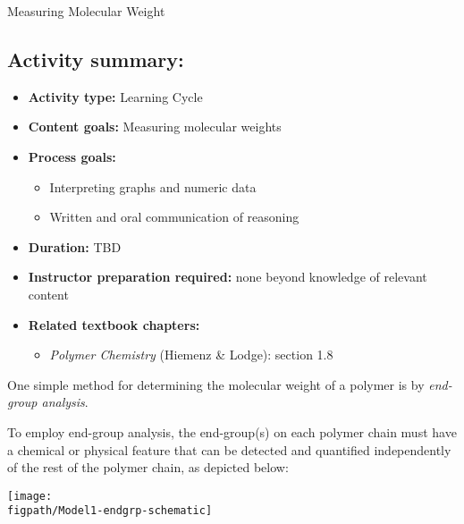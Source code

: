 \begin{activity}{Measuring Molecular Weight}
\begin{instructornotes}
	\subsection*{Activity summary:}
	\begin{itemize}
		\item \textbf{Activity type:} Learning Cycle
		\item \textbf{Content goals:} Measuring molecular weights
		\item \textbf{Process goals:} %
			\begin{itemize}
				\item Interpreting graphs and numeric data
				\item Written and oral communication of reasoning
			\end{itemize}
		\item \textbf{Duration:} TBD
		\item \textbf{Instructor preparation required:} none beyond knowledge of relevant content
		\item \textbf{Related textbook chapters:}
			\begin{itemize}
				\item \emph{Polymer Chemistry} (Hiemenz \& Lodge): section 1.8
			\end{itemize}
	\end{itemize}
	
\end{instructornotes}




\begin{model}
\label{\labelbase:mdl:endgrpanalysis}

	One simple method for determining the molecular weight of a polymer is by \emph{end-group analysis}.
	
	To employ end-group analysis, the end-group(s) on each polymer chain must have a chemical or physical feature that can be detected and quantified independently of the rest of the polymer chain, as depicted below:
	
	\centerline{\texttt{[image: \\figpath/Model1-endgrp-schematic]}}


\end{model}
\end{activity}
